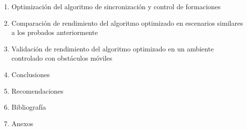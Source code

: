 \begin{enumerate}
\begin{enumerate}
\begin{enumerate}
		\end{enumerate}
	\end{enumerate}
	\item Optimización del algoritmo de sincronización y control de formaciones
	\item Comparación de rendimiento del algoritmo optimizado en escenarios similares a los probados anteriormente
	\item Validación de rendimiento del algoritmo optimizado en un ambiente controlado con obstáculos móviles
	\item Conclusiones
	\item Recomendaciones
	\item Bibliografía
	\item Anexos
\end{enumerate}